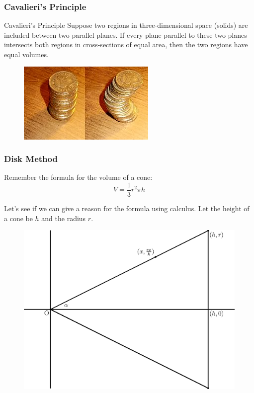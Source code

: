 \documentclass[xcolor=dvipsnames]{beamer}
\begin{document}
\begin{frame}
  \frametitle{Cavalieri's Principle}
  \begin{block}{Cavalieri's Principle}
    Suppose two regions in three-dimensional space (solids) are
    included between two parallel planes. If every plane parallel to
    these two planes intersects both regions in cross-sections of
    equal area, then the two regions have equal volumes.
  \end{block}
  \begin{figure}[h]
    \includegraphics[scale=2]{./cavalieri.jpg}
  \end{figure}
\end{frame}


\begin{frame}
  \frametitle{Disk Method}
Remember the formula for the volume of a cone:
\begin{equation}
  \label{eq:veishiir}
   V=\frac{1}{3}r^{2}\pi{}h 
\end{equation}

Let's see if we can give a reason for the formula using calculus. Let
the height of a cone be $h$ and the radius $r$.

\begin{figure}[h]
  \includegraphics[scale=0.4]{./conevol.eps}
\end{figure}
\end{frame}
\end{document}
